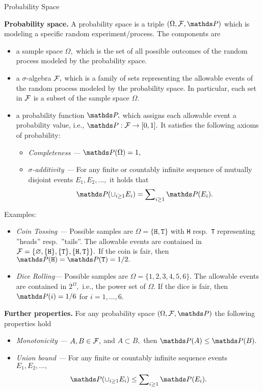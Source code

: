 \begin{vbframe}{Probability Space}
	
	\textbf{Probability space.} A probability space is a triple $(\Omega,\F,\P)$ which is modeling a specific random experiment/process.
		The components are
		\begin{itemize}
			\item a sample space $\Omega,$ which is the set of all possible outcomes of the random process modeled by the probability space.
			\item a $\sigma$-algebra $\mathcal{F},$ which is a family of sets representing the allowable events of the random process modeled by the probability space.
			In particular, each set in $\mathcal{F}$ is a subset of the sample space $\Omega.$
			\item a probability function $\P,$ which assigns each allowable event  a probability value, i.e., $\P:\F\to[0,1].$ It satisfies the following axioms of probability:
			\begin{itemize}
				\item  \emph{Completeness ---} $\P(\Omega)=1,$  
				\item  \emph{$\sigma$-additivity ---} For any finite or countably infinite sequence of mutually disjoint events $E_1,E_2,\ldots,$ it holds that
				$$\P(\cup_{i\geq1}  E_i) = \sum\nolimits_{i\geq 1} \P(E_i).$$
			\end{itemize}
		\end{itemize}
		\framebreak
		Examples:
		\begin{itemize}
			\item \emph{Coin Tossing ---} Possible samples are $\Omega=\{\texttt{H},\texttt{T} \}$ with \texttt{H} resp.\ \texttt{T} representing ''heads'' resp.\ ''tails''. The allowable events are contained in $\mathcal{F}=\{\varnothing,  \{\texttt{H}\} , \{\texttt{T}\}, \{\texttt{H},\texttt{T}\}  \}.$ If the coin is fair, then $\P(\texttt{H})=\P(\texttt{T})=1/2.$
			\item \emph{Dice Rolling---} Possible samples are $\Omega=\{1,2,3,4,5,6\}.$  The allowable events are contained in $2^\Omega,$ i.e., the power set of $\Omega.$
			If the dice is fair, then $\P(i)=1/6$ for $i=1,\ldots,6.$
		\end{itemize}
		\textbf{Further properties.} For any probability space $(\Omega,\F,\P)$ the following properties hold
		\begin{itemize}
			\item \emph{Monotonicity ---} $A,B\in \mathcal{F},$ and $A\subset B,$ then $\P(A)\leq \P(B).$
			\item \emph{Union bound ---}  For any finite or countably infinite sequence events $E_1,E_2,\ldots,$ 
			$$\P(\cup_{i\geq1}  E_i) \leq \sum\nolimits_{i\geq 1} \P(E_i).$$
		\end{itemize}

\end{vbframe}


